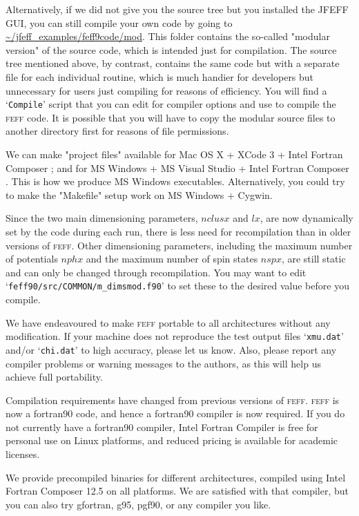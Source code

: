 \documentclass[11pt,oneside]{report} %
\newcommand{\program}[1]{\textsc{#1}}
\newcommand{\feff}{\program{feff}}
\newcommand{\file}[1]{`\texttt{#1}'}
\begin{document}
\begin{latexonly}
Alternatively, if we did not give you the source tree but you installed the JFEFF GUI, you can still compile your own code by going to \url{~/jfeff_examples/feff9code/mod}.  This folder contains the so-called "modular version" of the source code, which is intended just for compilation.  The source tree mentioned above, by contrast, contains the same code but with a separate file for each individual routine, which is much handier for developers but unnecessary for users just compiling for reasons of efficiency.  You will find a \file{Compile} script that you can edit for compiler options and use to compile the {\feff} code.  It is possible that you will have to copy the modular source files to another directory first for reasons of file permissions.

We can make "project files" available for Mac OS X + XCode 3 + Intel Fortran Composer ; and for MS Windows + MS Visual Studio + Intel Fortran Composer .  This is how we produce MS Windows executables.  Alternatively, you could try to make the "Makefile" setup work on MS Windows + Cygwin.

Since the two main dimensioning parameters, $nclusx$ and $lx$, are now dynamically set by the code during each run, there is less need for recompilation
than in older versions of {\feff}.  Other dimensioning parameters, including the maximum number of potentials $nphx$ and the maximum number of spin
states $nspx$, are still static and can only be changed through recompilation.  You may want to edit \file{feff90/src/COMMON/m\_dimsmod.f90} to set these to the desired value before you compile.

We have endeavoured to make {\feff} portable to all architectures without any modification. 
If your machine does not reproduce the test output files \file{xmu.dat}
and/or \file{chi.dat} to high accuracy,
please let us know. Also, please report any compiler problems or warning
messages to the authors, as this will help us achieve full portability.

Compilation requirements have changed from previous versions of {\feff}.  {\feff} is now a fortran90 code, and hence a fortran90 compiler is now required.  If you do not currently have a fortran90 compiler, Intel Fortran Compiler is free for personal use on Linux platforms, and reduced pricing is available for academic licenses.  

We provide precompiled binaries for different architectures, compiled using Intel Fortran Composer 12.5 on all platforms.  We are satisfied with that compiler, but you can also try gfortran, g95, pgf90, or any compiler you like.


\end{latexonly}
\end{document}
